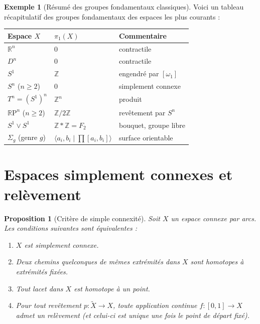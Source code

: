 \documentclass[12pt,a4paper,openany]{book}
\theoremstyle{definition}
\newtheorem{exemple}[definition]{Exemple}
\theoremstyle{plain}
\newtheorem{proposition}[definition]{Proposition}
\theoremstyle{remark}
\newcommand{\Z}{\mathbb{Z}}
\newcommand{\R}{\mathbb{R}}
\newcommand{\RP}{\mathbb{R}\mathrm{P}}
\begin{document}
\begin{exemple}[Résumé des groupes fondamentaux classiques]\label{ex:resume-pi1}
Voici un tableau récapitulatif des groupes fondamentaux des espaces les plus
courants :

\begin{center}
\begin{tabular}{lll}
\toprule
\textbf{Espace $X$} & $\pi_1(X)$ & \textbf{Commentaire} \\
\midrule
$\R^n$ & $0$ & contractile \\
$D^n$ & $0$ & contractile \\
$S^1$ & $\Z$ & engendré par $[\omega_1]$ \\
$S^n$ ($n \geqslant 2$) & $0$ & simplement connexe \\
$T^n = (S^1)^n$ & $\Z^n$ & produit \\
$\RP^n$ ($n \geqslant 2$) & $\Z/2\Z$ & revêtement par $S^n$ \\
$S^1 \vee S^1$ & $\Z * \Z = F_2$ & bouquet, groupe libre \\
$\Sigma_g$ (genre $g$) & $\langle a_i, b_i \mid \prod [a_i, b_i]\rangle$ & surface orientable \\
\bottomrule
\end{tabular}
\end{center}
\end{exemple}

\section{Espaces simplement connexes et relèvement}\label{sec:simplement-connexe-relevement}

\begin{proposition}[Critère de simple connexité]\label{prop:critere-simpl-connexe}
Soit $X$ un espace connexe par arcs. Les conditions suivantes sont équivalentes :
\begin{enumerate}[label=(\roman*)]
\item $X$ est simplement connexe.
\item Deux chemins quelconques de mêmes extrémités dans $X$ sont homotopes à
extrémités fixées.
\item Tout lacet dans $X$ est homotope à un point.
\item Pour tout revêtement $p : \widetilde{X} \to X$, toute application continue
$f : [0,1] \to X$ admet un relèvement (et celui-ci est unique une fois le point
de départ fixé).
\end{enumerate}
\end{proposition}
\end{document}
